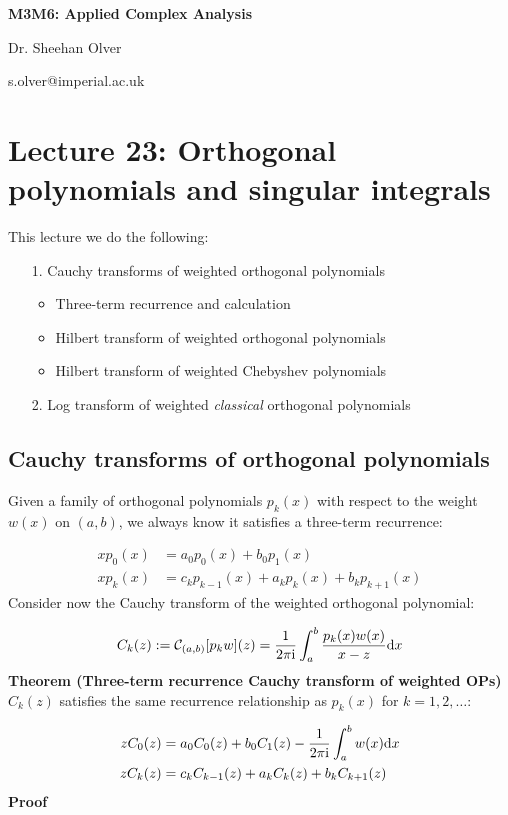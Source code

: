 \documentclass[12pt,a4paper]{article}
\def\D{ {\rm d} }
\def\I{ {\rm i} }
\def\dx{\D x}
\begin{document}
\textbf{M3M6: Applied Complex Analysis}

Dr. Sheehan Olver

s.olver@imperial.ac.uk

\section{Lecture 23: Orthogonal polynomials and singular integrals}
This lecture we do the following:

\begin{itemize}
\item[1. ] Cauchy transforms of weighted orthogonal polynomials

\begin{itemize}
\item Three-term recurrence and calculation


\item Hilbert transform of weighted orthogonal polynomials


\item Hilbert transform of weighted Chebyshev polynomials

\end{itemize}

\item[2. ] Log transform of weighted \emph{classical} orthogonal polynomials    

\end{itemize}
\subsection{Cauchy transforms of orthogonal polynomials}
Given a family of orthogonal polynomials $p_k(x)$ with respect to the weight $w(x)$ on $(a,b)$, we always know it satisfies a three-term recurrence:


\begin{align*}
x p_0(x) &= a_0 p_0(x) + b_0 p_1(x) \\
x p_k(x) &= c_k p_{k-1}(x) + a_k p_k(x) + b_k p_{k+1}(x)
\end{align*}
Consider now the Cauchy transform of the weighted orthogonal polynomial:

\[
C_k(z) := {\cal C}_{(a,b)}[p_k w](z) = {1 \over 2 \pi \I} \int_a^b {p_k(x) w(x) \over x -z} \dx
\]
\textbf{Theorem (Three-term recurrence Cauchy transform of weighted OPs)}  $C_k(z)$ satisfies the same recurrence relationship as $p_k(x)$ for $k=1,2,\ldots$:


\begin{align*}
z C_0(z) &= a_0 C_0(z) + b_0 C_1(z) - {1 \over 2 \pi \I} \int_a^b w(x) \dx \\
z C_k(z) &= c_k C_{k-1}(z) + a_k C_k(z) + b_k C_{k+1}(z)
\end{align*}
\textbf{Proof}
\end{document}
